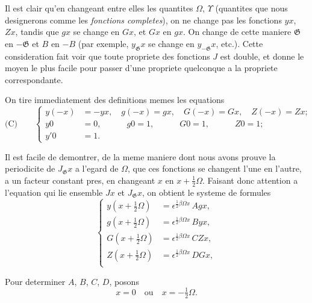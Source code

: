 \documentclass[11pt,a4paper]{article}
\begin{document}
Il est clair qu'en changeant entre elles les quantites $\Omega$, $\Upsilon$ (quantites que nous
designerons comme les \textit{fonctions completes}), on ne change pas les fonctions $yx$, $Zx$,
tandis que $gx$ se change en $Gx$, et $Gx$ en $gx$. On change de cette maniere $\mathfrak{G}$ en $-\mathfrak{G}$
et $B$ en $-B$ (par exemple, $y_{\mathfrak{G}}x$ se change en $y_{-\mathfrak{G}}x$, etc.). Cette consideration fait voir
que toute propriete des fonctions $J$ est double, et donne le moyen le plus facile pour
passer d'une propriete quelconque a la propriete correspondante.

On tire immediatement des definitions memes les equations
\begin{equation*}
\text{(C)}\qquad
\left\{
\begin{aligned}
y(-x) &= -yx,\quad g(-x) = gx,\quad G(-x) = Gx,\quad Z(-x) = Zx;\\
y0 &= 0,\qquad\quad g0 = 1,\qquad\quad G0 = 1,\qquad\quad Z0 = 1;\\
y'0 &= 1.
\end{aligned}
\right.
\end{equation*}

Il est facile de demontrer, de la meme maniere dont nous avons prouve la periodicite
de $J_{\mathfrak{G}}x$ a l'egard de $\Omega$, que ces fonctions se changent l'une en l'autre, a un facteur
constant pres, en changeant $x$ en $x + \frac{1}{2}\Omega$. Faisant donc attention a l'equation qui lie
ensemble $Jx$ et $J_{\mathfrak{G}}x$, on obtient le systeme de formules
\begin{equation}
\left\{
\begin{aligned}
y\left(x + \tfrac{1}{2}\Omega\right) &= \epsilon^{\frac{1}{2}\beta\Omega x}\, Agx,\\
g\left(x + \tfrac{1}{2}\Omega\right) &= \epsilon^{\frac{1}{2}\beta\Omega x}\, Byx,\\
G\left(x + \tfrac{1}{2}\Omega\right) &= \epsilon^{\frac{1}{2}\beta\Omega x}\, CZx,\\
Z\left(x + \tfrac{1}{2}\Omega\right) &= \epsilon^{\frac{1}{2}\beta\Omega x}\, DGx,\\
\end{aligned}
\right. \tag{22}
\end{equation}

Pour determiner $A$, $B$, $C$, $D$, posons
\[x = 0\quad \text{ou}\quad x = -\tfrac{1}{2}\Omega.\]
\end{document}
